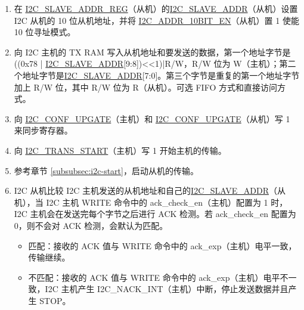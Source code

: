 \documentclass[main\_\_CN.tex]{subfiles}
\begin{document}
\begin{enumerate}
\item 在 \hyperref[regdesc:I2CSLAVEADDRREG]{I2C\_SLAVE\_ADDR\_REG}（从机）的\hyperref[fielddesc:I2CSLAVEADDR]{I2C\_SLAVE\_ADDR}（从机）设置 I2C 从机的 10 位从机地址，并将 \hyperref[fielddesc:I2CADDR10BITEN]{I2C\_ADDR\_10BIT\_EN}（从机）置 1 使能 10 位寻址模式。
\item 向 I2C 主机的 TX RAM 写入从机地址和要发送的数据，第一个地址字节是 ((0x78 | \hyperref[fielddesc:I2CSLAVEADDR]{I2C\_SLAVE\_ADDR}[9:8])<<1)|R/W，R/W 位为 W（主机）；第二个地址字节是\hyperref[fielddesc:I2CSLAVEADDR]{I2C\_SLAVE\_ADDR}[7:0]。第三个字节是重复的第一个地址字节加上 R/W 位，其中 R/W 位为 R（从机）。可选 FIFO 方式和直接访问方式。
\item 向 \hyperref[fielddesc:I2CCONFUPGATE]{I2C\_CONF\_UPGATE}（主机）和 \hyperref[fielddesc:I2CCONFUPGATE]{I2C\_CONF\_UPGATE}（从机）写 1 来同步寄存器。
\item 向 \hyperref[fielddesc:I2CTRANSSTART]{I2C\_TRANS\_START}（主机）写 1 开始主机的传输。
\item 参考章节 \ref{subsubsec:i2c-start}，启动从机的传输。
\item I2C 从机比较 I2C 主机发送的从机地址和自己的\hyperref[fielddesc:I2CSLAVEADDR]{I2C\_SLAVE\_ADDR}（从机），当 I2C 主机 WRITE 命令中的 ack\_check\_en（主机）配置为 1 时，I2C 主机会在发送完每个字节之后进行 ACK 检测。若 ack\_check\_en 配置为 0，则不会对 ACK 检测，会默认为匹配。

\begin{itemize}
\item 匹配：接收的 ACK 值与 WRITE 命令中的 ack\_exp（主机）电平一致，传输继续。
\item 不匹配：接收的 ACK 值与 WRITE 命令中的 ack\_exp（主机）电平不一致，I2C 主机产生 I2C\_NACK\_INT（主机）中断，停止发送数据并且产生 STOP。
\end{itemize}


\end{enumerate}
\end{document}
